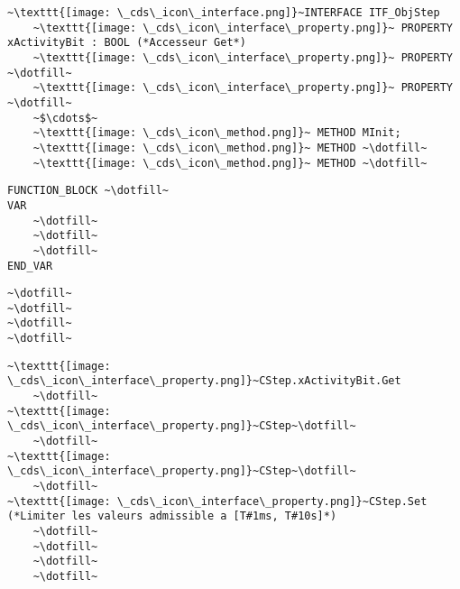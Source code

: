 \begin{UPSTIactivite}

\begin{lstlisting}[escapechar=~, numbers=none, basicstyle=\Large, language=st]
~\texttt{[image: \_cds\_icon\_interface.png]}~INTERFACE ITF_ObjStep
    ~\texttt{[image: \_cds\_icon\_interface\_property.png]}~ PROPERTY xActivityBit : BOOL (*Accesseur Get*)
    ~\texttt{[image: \_cds\_icon\_interface\_property.png]}~ PROPERTY ~\dotfill~
    ~\texttt{[image: \_cds\_icon\_interface\_property.png]}~ PROPERTY ~\dotfill~
    ~$\cdots$~
    ~\texttt{[image: \_cds\_icon\_method.png]}~ METHOD MInit;
    ~\texttt{[image: \_cds\_icon\_method.png]}~ METHOD ~\dotfill~
    ~\texttt{[image: \_cds\_icon\_method.png]}~ METHOD ~\dotfill~
\end{lstlisting}
\end{UPSTIactivite}
\pagebreak
\begin{UPSTIactivite}
\begin{lstlisting}[escapechar=~, basicstyle=\Large, language=st]
FUNCTION_BLOCK ~\dotfill~
VAR
    ~\dotfill~
    ~\dotfill~
    ~\dotfill~
END_VAR
\end{lstlisting}
\begin{lstlisting}[escapechar=~, basicstyle=\Large, language=st]
~\dotfill~
~\dotfill~
~\dotfill~
~\dotfill~
\end{lstlisting}
\begin{lstlisting}[numbers=none, escapechar=~, basicstyle=\Large, language=st]
~\texttt{[image: \_cds\_icon\_interface\_property.png]}~CStep.xActivityBit.Get
    ~\dotfill~
~\texttt{[image: \_cds\_icon\_interface\_property.png]}~CStep~\dotfill~
    ~\dotfill~
~\texttt{[image: \_cds\_icon\_interface\_property.png]}~CStep~\dotfill~
    ~\dotfill~
~\texttt{[image: \_cds\_icon\_interface\_property.png]}~CStep.Set (*Limiter les valeurs admissible a [T#1ms, T#10s]*)
    ~\dotfill~
    ~\dotfill~
    ~\dotfill~
    ~\dotfill~
\end{lstlisting}
\end{UPSTIactivite}

